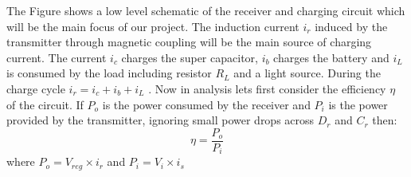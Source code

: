 The Figure %
shows a low level schematic of the receiver and charging circuit which will be the main focus of our project. The induction current $i_r$ induced by the transmitter through magnetic coupling will be the main source of charging current. The current $i_c$ charges the super capacitor, $i_b$ charges the battery and $i_L$ is consumed by the load including resistor $R_L$ and a light source. During the charge cycle $i_r = i_c + i_b +i_L$ . Now in analysis lets first consider the efficiency ${\eta}$ of the circuit.
If $P_{o}$ is the power consumed by the receiver and $P_{i}$ is the power provided by the transmitter, ignoring small power drops across $D_r$ and $C_r$  then:
\begin{equation}\label{eq:effb}
 {\eta} = \frac{P_o}{P_i}
\end{equation}
where $P_o = V_{reg} \times i_r $ and $P_i = V_i \times i_s $